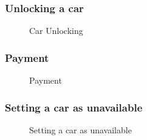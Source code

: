 \documentclass[english]{article}
\begin{document}
\subsubsection{Unlocking a car}
\begin{figure}[H]
	\centering
	\caption{Car Unlocking}
	\label{seq_carunlock}
\end{figure}

\subsubsection{Payment}
\begin{figure}[H]
	\centering
	\makebox[\textwidth][c]{
		\def\svgwidth{450pt}
		
	}
	\caption{Payment}
	\label{seq_payment}
\end{figure}

\subsubsection{Setting a car as unavailable}
\begin{figure}[H]
	\centering
	\caption{Setting a car as unavailable}
	\label{seq_carunavailable}
\end{figure}
\end{document}
